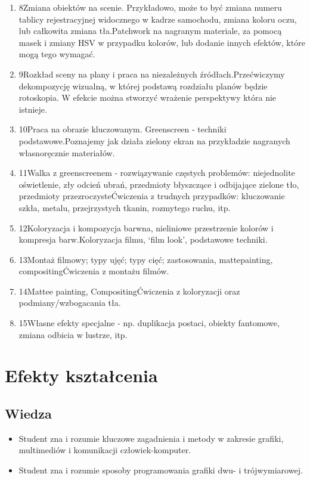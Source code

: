 \documentclass[12pt, a4paper]{article}
\begin{document}
\begin{enumerate}
  \item 8Zmiana obiektów na scenie. Przykładowo, może to być zmiana numeru tablicy rejestracyjnej widocznego w kadrze samochodu, zmiana koloru oczu, lub całkowita zmiana tła.Patchwork na nagranym materiale, za pomocą masek i zmiany HSV w przypadku kolorów, lub dodanie innych efektów, które mogą tego wymagać.
  \item 9Rozkład sceny na plany i praca na niezależnych źródłach.Przećwiczymy dekompozycję wizualną, w której podstawą rozdziału planów będzie rotoskopia. W efekcie można stworzyć wrażenie perspektywy która nie istnieje.
  \item 10Praca na obrazie kluczowanym. Greenscreen - techniki podstawowe.Poznajemy jak działa zielony ekran na przykładzie nagranych własnoręcznie materiałów.
  \item 11Walka z greenscreenem - rozwiązywanie częstych problemów: niejednolite oświetlenie, zły odcień ubrań, przedmioty błyszczące i odbijające zielone tło, przedmioty przezroczysteĆwiczenia z trudnych przypadków: kluczowanie szkła, metalu, przejrzystych tkanin, rozmytego ruchu, itp.
  \item 12Koloryzacja i kompozycja barwna, nieliniowe przestrzenie kolorów i kompresja barw.Koloryzacja filmu, ‘film look’, podstawowe techniki.
  \item 13Montaż filmowy; typy ujęć; typy cięć; zastosowania, mattepainting, compositingĆwiczenia z montażu filmów.
  \item 14Mattee painting, CompositingĆwiczenia z koloryzacji oraz podmiany/wzbogacania tła.
  \item 15Własne efekty specjalne - np. duplikacja postaci, obiekty fantomowe, zmiana odbicia w lustrze, itp.
\end{enumerate}

\section{Efekty kształcenia}

\subsection*{Wiedza}
\begin{itemize}
  \item Student zna i rozumie kluczowe zagadnienia i metody w zakresie grafiki, multimediów i komunikacji człowiek-komputer.
  \item Student zna i rozumie sposoby programowania grafiki dwu- i trójwymiarowej.
\end{itemize}
\end{document}
